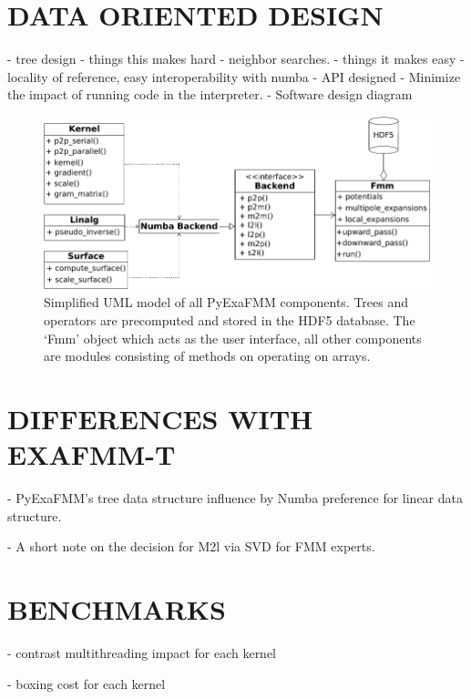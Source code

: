 \documentclass{IEEEcsmag}
\begin{document}


\section{DATA ORIENTED DESIGN}

- tree design
    - things this makes hard - neighbor searches.
    - things it makes easy - locality of reference, easy interoperability with numba
- API designed
    - Minimize the impact of running code in the interpreter.
- Software design diagram

\begin{figure}
    \centerline{\includegraphics {figures/software.pdf}}
    \caption{Simplified UML model of all PyExaFMM components. Trees and operators are precomputed and stored in the HDF5 database. The `Fmm' object which acts as the user interface, all other components are modules consisting of methods on operating on arrays.}
    \label{fig:design}
\end{figure}

\section{DIFFERENCES WITH EXAFMM-T}

- PyExaFMM's tree data structure influence by Numba preference for linear data structure.

- A short note on the decision for M2l via SVD for FMM experts.


\section{BENCHMARKS}

- contrast multithreading impact for each kernel

- boxing cost for each kernel
\end{document}
